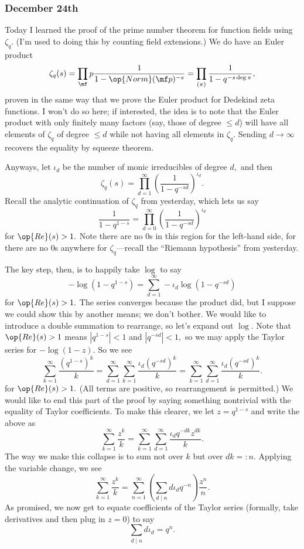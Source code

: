 \subsubsection{December 24th}
Today I learned the proof of the prime number theorem for function fields using $\zeta_q.$ (I'm used to doing this by counting field extensions.) We do have an Euler product
\[\zeta_q(s)=\prod_\mf p\frac1{1-\op{Norm}(\mf p)^{-s}}=\prod_{(\pi)}\frac1{1-q^{-s\deg\pi}},\]
proven in the same way that we prove the Euler product for Dedekind zeta functions. I won't do so here; if interested, the idea is to note that the Euler product with only finitely many factors (say, those of degree $\le d$) will have all elements of $\zeta_q$ of degree $\le d$ while not having all elements in $\zeta_q.$ Sending $d\to\infty$ recovers the equality by squeeze theorem.

Anyways, let $\iota_d$ be the number of monic irreducibles of degree $d,$ and then
\[\zeta_q(s)=\prod_{d=1}^\infty\left(\frac1{1-q^{-sd}}\right)^{\iota_d}.\]
Recall the analytic continuation of $\zeta_q$ from yesterday, which lets us say
\[\frac1{1-q^{1-s}}=\prod_{d=0}^\infty\left(\frac1{1-q^{-sd}}\right)^{\iota_d}\]
for $\op{Re}(s)>1.$ Note there are no $0$s in this region for the left-hand side, for there are no $0$s anywhere for $\zeta_q$---recall the ``Riemann hypothesis'' from yesterday.

The key step, then, is to happily take $\log$ to say
\[-\log\left(1-q^{1-s}\right)=\sum_{d=1}^\infty-\iota_d\log\left(1-q^{-sd}\right)\]
for $\op{Re}(s)>1.$ The series converges because the product did, but I suppose we could show this by another means; we don't bother. We would like to introduce a double summation to rearrange, so let's expand out $\log.$ Note that $\op{Re}(s)>1$ means $\left|q^{1-s}\right|<1$ and $\left|q^{-sd}\right|<1,$ so we may apply the Taylor series for $-\log(1-z).$ So we see
\[\sum_{k=1}^\infty\frac{\left(q^{1-s}\right)^k}k=\sum_{d=1}^\infty\sum_{k=1}^\infty\frac{\iota_d\left(q^{-sd}\right)^k}k=\sum_{k=1}^\infty\sum_{d=1}^\infty\frac{\iota_d\left(q^{-sd}\right)^k}k.\]
for $\op{Re}(s)>1.$ (All terms are positive, so rearrangement is permitted.) We would like to end this part of the proof by saying something nontrivial with the equality of Taylor coefficients. To make this clearer, we let $z=q^{1-s}$ and write the above as
\[\sum_{k=1}^\infty\frac{z^k}k=\sum_{k=1}^\infty\sum_{d=1}^\infty\frac{\iota_dq^{-dk}z^{dk}}k.\]
The way we make this collapse is to sum not over $k$ but over $dk=:n.$ Applying the variable change, we see
\[\sum_{k=1}^\infty\frac{z^k}k=\sum_{n=1}^\infty\left(\sum_{d\mid n}d\iota_dq^{-n}\right)\frac{z^n}n.\]
As promised, we now get to equate coefficients of the Taylor series (formally, take derivatives and then plug in $z=0$) to say
\[\sum_{d\mid n}d\iota_d=q^n.\]

